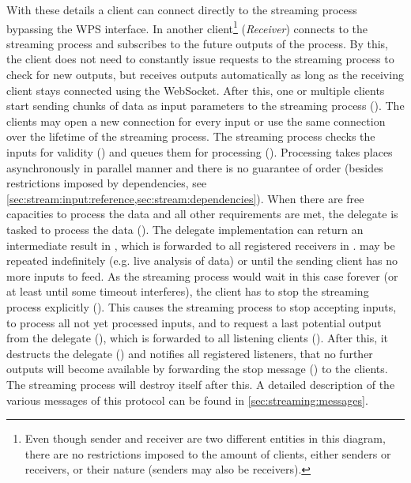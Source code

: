   With these details a client can connect directly to the streaming process bypassing the \ac{WPS} interface. In  another client\footnote{Even though sender and receiver are two different entities in this diagram, there are no restrictions imposed to the amount of clients, either senders or receivers, or their nature (senders may also be receivers).} (\emph{Receiver}) connects to the streaming process and subscribes to the future outputs of the process. By this, the client does not need to constantly issue requests to the streaming process to check for new outputs, but receives outputs automatically as long as the receiving client stays connected using the WebSocket. After this, one or multiple clients start sending chunks of data as input parameters to the streaming process (). The clients may open a new connection for every input or use the same connection over the lifetime of the streaming process. The streaming process checks the inputs for validity () and queues them for processing (). Processing takes places asynchronously in parallel manner and there is no guarantee of order (besides restrictions imposed by dependencies, see \cref{sec:stream:input:reference,sec:stream:dependencies}). When there are free capacities to process the data and all other requirements are met, the delegate is tasked to process the data (). The delegate implementation can return an intermediate result in , which is forwarded to all registered receivers in .  may be repeated indefinitely (e.g. live analysis of data) or until the sending client has no more inputs to feed. As the streaming process would wait in this case forever (or at least until some timeout interferes), the client has to stop the streaming process explicitly (). This causes the streaming process to stop accepting inputs, to process all not yet processed inputs, and to request a last potential output from the delegate (), which is forwarded to all listening clients (). After this, it destructs the delegate () and notifies all registered listeners, that no further outputs will become available by forwarding the stop message () to the clients. The streaming process will destroy itself after this. A detailed description of the various messages of this protocol can be found in \cref{sec:streaming:messages}.

